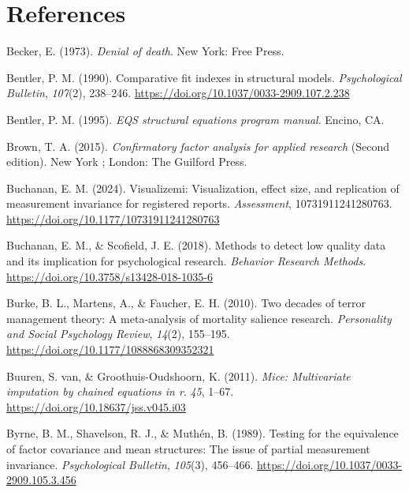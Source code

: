 \documentclass[
  english,
  man]{apa6}
\newlength{\cslhangindent}
\newenvironment{CSLReferences}[2] %
 {\begin{list}{}{%
  \setlength{\itemindent}{0pt}
  \setlength{\leftmargin}{0pt}
  \setlength{\parsep}{0pt}
  \ifodd #1
   \setlength{\leftmargin}{\cslhangindent}
   \setlength{\itemindent}{-1\cslhangindent}
  \fi
  \setlength{\itemsep}{#2\baselineskip}}}
 {\end{list}}
\begin{document}
\section{References}\label{references}

\protect{}\label{refs}
\begin{CSLReferences}{1}{0}
Becker, E. (1973). \emph{Denial of death}. New York: Free Press.

Bentler, P. M. (1990). Comparative fit indexes in structural models. \emph{Psychological Bulletin}, \emph{107}(2), 238--246. \url{https://doi.org/10.1037/0033-2909.107.2.238}

Bentler, P. M. (1995). \emph{EQS structural equations program manual}. Encino, CA.

Brown, T. A. (2015). \emph{Confirmatory factor analysis for applied research} (Second edition). New York ; London: The Guilford Press.

Buchanan, E. M. (2024). Visualizemi: Visualization, effect size, and replication of measurement invariance for registered reports. \emph{Assessment}, 10731911241280763. \url{https://doi.org/10.1177/10731911241280763}

Buchanan, E. M., \& Scofield, J. E. (2018). Methods to detect low quality data and its implication for psychological research. \emph{Behavior Research Methods}. \url{https://doi.org/10.3758/s13428-018-1035-6}

Burke, B. L., Martens, A., \& Faucher, E. H. (2010). Two decades of terror management theory: A meta-analysis of mortality salience research. \emph{Personality and Social Psychology Review}, \emph{14}(2), 155--195. \url{https://doi.org/10.1177/1088868309352321}

Buuren, S. van, \& Groothuis-Oudshoorn, K. (2011). \emph{{\textbraceleft}Mice{\textbraceright}: Multivariate imputation by chained equations in r}. \emph{45}, 1--67. \url{https://doi.org/10.18637/jss.v045.i03}

Byrne, B. M., Shavelson, R. J., \& Muthén, B. (1989). Testing for the equivalence of factor covariance and mean structures: The issue of partial measurement invariance. \emph{Psychological Bulletin}, \emph{105}(3), 456--466. \url{https://doi.org/10.1037/0033-2909.105.3.456}


\end{CSLReferences}
\end{document}
